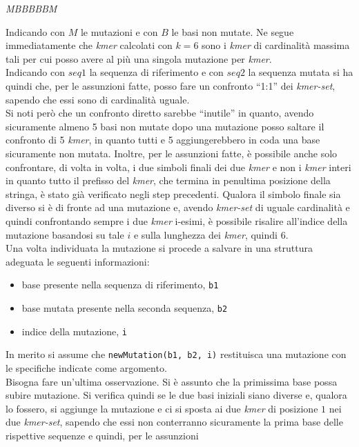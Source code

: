\documentclass[a4paper,12pt, oneside]{book}
\begin{document}
\begin{center}
  \textit{{\color{red}M}BBBBB{\color{red}M}}
\end{center}
Indicando con $M$ le mutazioni e con $B$ le basi non mutate. Ne segue
immediatamente che \textit{kmer} calcolati con $k=6$ sono i \textit{kmer} di
cardinalità massima tali per cui posso avere al più una singola mutazione per
\textit{kmer}. \\
Indicando con $seq1$ la sequenza di riferimento e con $seq2$ la sequenza mutata
si ha quindi che, per le assunzioni fatte, posso fare un confronto ``1:1'' dei
\textit{kmer-set}, sapendo che essi sono di cardinalità uguale.\\
Si noti però che un confronto diretto sarebbe ``inutile'' in quanto, avendo
sicuramente almeno 5 basi non mutate dopo una mutazione posso saltare il
confronto di 5 \textit{kmer}, in quanto tutti e 5 aggiungerebbero in coda una
base sicuramente non mutata. Inoltre, per le assunzioni fatte, è possibile anche
solo confrontare, di volta in volta, i due simboli finali dei due \textit{kmer}
e non i \textit{kmer} interi in quanto tutto il prefisso del \textit{kmer}, che
termina in penultima posizione della stringa, è stato già verificato negli step
precedenti. Qualora il simbolo finale sia diverso si è di fronte ad una
mutazione e, avendo \textit{kmer-set} di uguale cardinalità e quindi
confrontando sempre i due \textit{kmer} i-esimi, è possibile risalire all'indice
della mutazione basandosi su tale $i$ e sulla lunghezza dei \textit{kmer},
quindi $6$.\\
Una volta individuata la mutazione si procede a salvare in una struttura
adeguata le seguenti informazioni:
\begin{itemize}
  \item base presente nella sequenza di riferimento, \texttt{b1}
  \item base mutata presente nella seconda sequenza, \texttt{b2}
  \item indice della mutazione, \texttt{i}
\end{itemize}
In merito si assume che \texttt{newMutation(b1, b2, i)} restituisca una
mutazione con le specifiche indicate come argomento.\\
Bisogna fare un'ultima osservazione. Si è assunto che la primissima base possa
subire mutazione. Si verifica quindi se le due basi iniziali siano diverse e,
qualora lo fossero, si aggiunge la mutazione e ci si sposta ai due \textit{kmer}
di posizione $1$ nei due \textit{kmer-set}, sapendo che essi non conterranno
sicuramente la prima base delle rispettive sequenze e quindi, per le assunzioni
\end{document}
